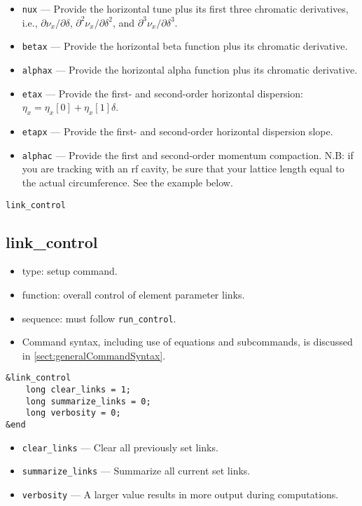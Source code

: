 \documentclass[11pt]{article}
\begin{document}
\begin{itemize}
\item \verb|nux| --- Provide the horizontal tune plus its first three chromatic derivatives, i.e.,
  $\partial \nu_x/\partial\delta$, $\partial^2 \nu_x/\partial\delta^2$, and
  $\partial^3 \nu_x/\partial\delta^3$.
\item \verb|betax| --- Provide the horizontal beta function plus its chromatic derivative.
\item \verb|alphax| --- Provide the horizontal alpha function plus its chromatic derivative.
\item \verb|etax| --- Provide the first- and second-order horizontal dispersion:
  $\eta_x = \eta_x\left[0\right] + \eta_x\left[1\right]\delta$.
\item \verb|etapx| --- Provide the first- and second-order horizontal dispersion slope.
\item \verb|alphac| --- Provide the first and second-order momentum compaction.  N.B: if you are tracking
 with an rf cavity, be sure that your lattice length equal to the actual circumference.  See the example below.
\end{itemize}

\newpage
\begin{center}{\Large\verb|link_control|}\end{center}
\subsection{link\_control \label{subsec:linkcontrol}}

\begin{itemize}
\item type: setup command.
\item function: overall control of element parameter links.
\item sequence: must follow \verb|run_control|.
\item Command syntax, including use of equations and subcommands, is discussed in \ref{sect:generalCommandSyntax}.
\end{itemize}

\begin{verbatim}
&link_control
    long clear_links = 1;
    long summarize_links = 0;
    long verbosity = 0;
&end
\end{verbatim}

\begin{itemize}
\item \verb|clear_links| --- Clear all previously set links.
\item \verb|summarize_links| --- Summarize all current set links.
\item \verb|verbosity| --- A larger value results in more output
during computations.

\end{itemize}
\end{document}
